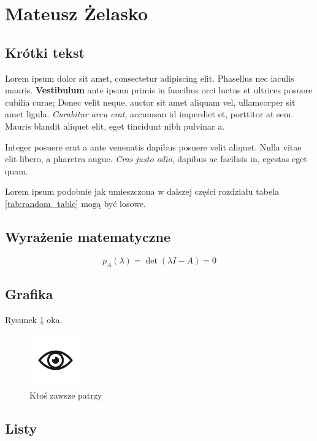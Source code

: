 \section{Mateusz Żelasko}
\label{sec:mtzea}

\subsection{Krótki tekst}

Lorem ipsum dolor sit amet, consectetur adipiscing elit. Phasellus nec iaculis mauris. \textbf{Vestibulum} ante ipsum primis in faucibus orci luctus et ultrices posuere cubilia curae; Donec velit neque, auctor sit amet aliquam vel, ullamcorper sit amet ligula. \emph{Curabitur arcu erat}, accumsan id imperdiet et, porttitor at sem. Mauris blandit aliquet elit, eget tincidunt nibh pulvinar a.

Integer posuere erat a ante venenatis dapibus posuere velit aliquet. Nulla vitae elit libero, a pharetra augue. \textit{Cras justo odio}, dapibus ac facilisis in, egestas eget quam.

Lorem ipsum podobnie jak umieszczona w dalszej części rozdziału tabela \ref{tab:random_table} mogą być losowe.

\subsection{Wyrażenie matematyczne}

\begin{equation}
    p_A(\lambda) = \det(\lambda I - A) = 0
\end{equation}

\subsection{Grafika}

Rysunek \ref{fig:eye} oka.

\begin{figure}[htbp]
    \centering
    \includegraphics[width=0.2\textwidth]{pictures/eye.jpg}
    \caption{Ktoś zawsze patrzy}
    \label{fig:eye}
\end{figure}

\subsection{Listy}

